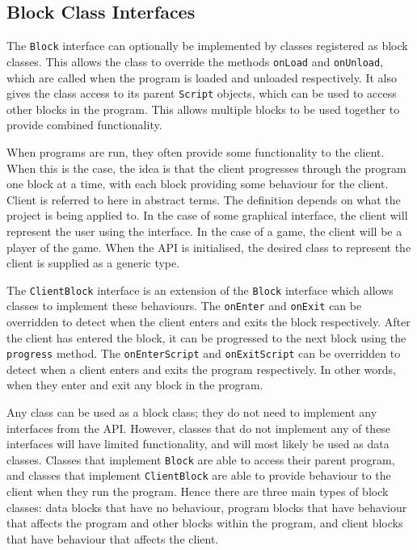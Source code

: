 \subsection{Block Class Interfaces}
The \texttt{Block} interface can optionally be implemented by classes registered as block classes. This allows the class to override the methods \texttt{onLoad} and \texttt{onUnload}, which are called when the program is loaded and unloaded respectively. It also gives the class access to its parent \texttt{Script} objects, which can be used to access other blocks in the program. This allows multiple blocks to be used together to provide combined functionality.\par

When programs are run, they often provide some functionality to the client. When this is the case, the idea is that the client progresses through the program one block at a time, with each block providing some behaviour for the client. Client is referred to here in abstract terms. The definition depends on what the project is being applied to. In the case of some graphical interface, the client will represent the user using the interface. In the case of a game, the client will be a player of the game. When the API is initialised, the desired class to represent the client is supplied as a generic type.\par

The \texttt{ClientBlock} interface is an extension of the \texttt{Block} interface which allows classes to implement these behaviours. The \texttt{onEnter} and \texttt{onExit} can be overridden to detect when the client enters and exits the block respectively. After the client has entered the block, it can be progressed to the next block using the \texttt{progress} method. The \texttt{onEnterScript} and \texttt{onExitScript} can be overridden to detect when a client enters and exits the program respectively. In other words, when they enter and exit any block in the program.\par

Any class can be used as a block class; they do not need to implement any interfaces from the API. However, classes that do not implement any of these interfaces will have limited functionality, and will most likely be used as data classes. Classes that implement \texttt{Block} are able to access their parent program, and classes that implement \texttt{ClientBlock} are able to provide behaviour to the client when they run the program. Hence there are three main types of block classes: data blocks that have no behaviour, program blocks that have behaviour that affects the program and other blocks within the program, and client blocks that have behaviour that affects the client.
